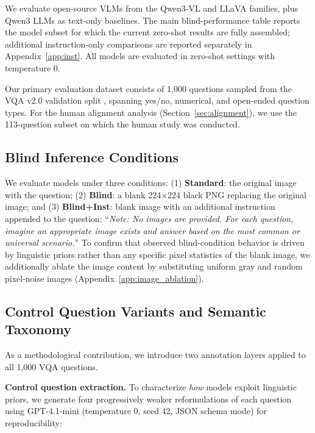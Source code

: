 \documentclass[letterpaper]{article}
\begin{document}
We evaluate open-source VLMs from the Qwen3-VL \citep{bai2025qwen3vl} and LLaVA
\citep{liu2023visual,liu2024llavanext} families, plus Qwen3
\citep{yang2025qwen3} LLMs as text-only baselines. The main blind-performance
table reports the model subset for which the current zero-shot results are
fully assembled; additional instruction-only comparisons are reported
separately in Appendix~\ref{app:inst}. All models are evaluated in zero-shot
settings with temperature 0.

Our primary evaluation dataset consists of 1,000 questions sampled from the
VQA v2.0 validation split \citep{goyal2016making}, spanning yes/no,
numerical, and open-ended question types. For the human alignment analysis
(Section~\ref{sec:alignment}), we use the 113-question subset
on which the human study was conducted.

\subsection{Blind Inference Conditions}

We evaluate models under three conditions: (1) \textbf{Standard}: the original
image with the question; (2) \textbf{Blind}: a blank 224$\times$224 black PNG
replacing the original image; and (3) \textbf{Blind+Inst}: blank image with an
additional instruction appended to the question: ``\textit{Note: No images are
provided. For each question, imagine an appropriate image exists and answer
based on the most common or universal scenario.}''
To confirm that observed blind-condition behavior is driven by linguistic
priors rather than any specific pixel statistics of the blank image, we
additionally ablate the image content by substituting uniform gray and random
pixel-noise images (Appendix~\ref{app:image_ablation}).

\subsection{Control Question Variants and Semantic Taxonomy}
\label{sec:control}

As a methodological contribution, we introduce two annotation layers applied to
all 1{,}000 VQA questions.

\textbf{Control question extraction.}
To characterize \emph{how} models exploit linguistic priors, we generate four
progressively weaker reformulations of each question using
GPT-4.1-mini (temperature 0, seed 42, JSON schema mode) for reproducibility:
\end{document}
